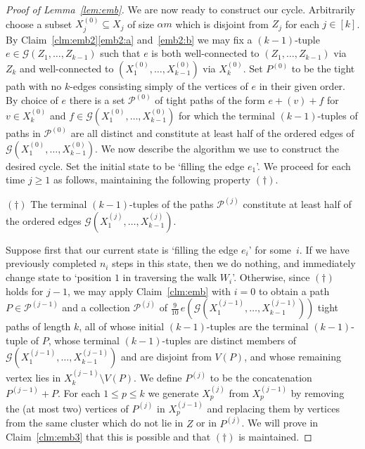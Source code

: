 \documentclass[12pt,a4paper]{amsart}
\newcommand{\cG}{\mathcal{G}}
\newcommand{\paths}{\mathscr{P}}
\begin{document}
\begin{proof}[Proof of Lemma~\ref{lem:emb}]
 We are now ready to construct our cycle. Arbitrarily choose a subset $X^{(0)}_j \subseteq X_j$ of size $\alpha m$ which is disjoint from $Z_j$ for each $j \in [k]$. By Claim~\ref{clm:emb2}\ref{emb2:a} and~\ref{emb2:b} we may fix a $(k-1)$-tuple 
 $e \in \cG(Z_1,\ldots,Z_{k-1})$ such that $e$ is both well-connected to $(Z_1, \dots, Z_{k-1})$ via $Z_k$ and well-connected to $(X^{(0)}_1, \dots, X^{(0)}_{k-1})$ via $X^{(0)}_k$. Set $P^{(0)}$ to be the tight path with no 
 $k$-edges consisting simply of the vertices of $e$ in their given order. By choice of $e$ there is a set 
 $\paths^{(0)}$ of tight paths of the form $e + (v) + f$ for $v \in X^{(0)}_k$ and $f \in \cG(X_1^{(0)}, \dots, X_{k-1}^{(0)})$ for which the terminal $(k-1)$-tuples of paths in $\paths^{(0)}$ are all distinct and constitute at least half of the ordered edges of $\cG(X_1^{(0)}, \dots, X_{k-1}^{(0)})$. We now describe the algorithm we use to construct the desired cycle.
 Set the initial state to be `filling the edge $e_1$'. We proceed for each time $j \geq 1$ as follows, maintaining the following property $(\dagger)$.

\medskip
\noindent $(\dagger)$ The terminal $(k-1)$-tuples of the paths $\paths^{(j)}$ constitute at least half of the ordered edges $\cG(X^{(j)}_1,\ldots,X^{(j)}_{k-1})$.

\medskip
Suppose first that our current state is `filling the edge $e_i$' for some~$i$. If we have previously completed $n_i$ steps in this state, then we do nothing, and immediately change state to `position $1$ in traversing the walk $W_i$'. 
Otherwise, since $(\dagger)$ holds for $j-1$, 
we may apply Claim~\ref{clm:emb} with
 $i=0$ to obtain a path $P\in\paths^{(j-1)}$ and a collection $\paths^{(j)}$ of $\tfrac{9}{10}\,e(\cG(X^{(j-1)}_{1},\ldots,X^{(j-1)}_{k-1}))$ tight paths of length $k$, all of whose initial $(k-1)$-tuples are the terminal $(k-1)$-tuple of $P$,
 whose terminal $(k-1)$-tuples are distinct members of
 $\cG(X^{(j-1)}_{1},\ldots,X^{(j-1)}_{k-1})$ and are disjoint from $V(P)$, and whose remaining vertex lies in $X^{(j-1)}_k \setminus V(P)$. 
We define $P^{(j)}$ to be the concatenation $P^{(j-1)} + P$. For each $1\le p\le k$ we  generate $X^{(j)}_p$ from $X^{(j-1)}_p$ by removing the (at most two) vertices  of $P^{(j)}$ in $X^{(j-1)}_p$ and replacing them by vertices from the same cluster which do not lie in $Z$ or in $P^{(j)}$. We will prove in Claim~\ref{clm:emb3} that this is possible and that $(\dagger)$ is maintained.


\end{proof}
\end{document}
